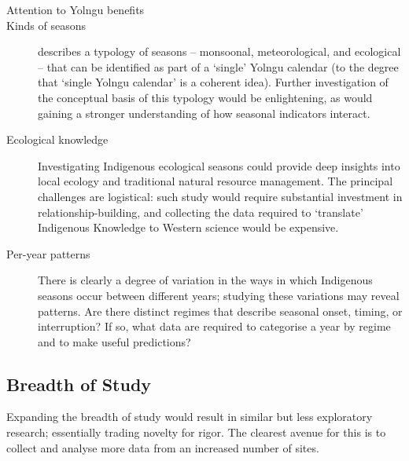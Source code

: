\begin{description}
\item[Attention to Yolngu benefits]

\item[Kinds of seasons]
     describes a typology of seasons -- monsoonal,
    meteorological, and ecological -- that can be identified as part of a
    `single' Yolngu calendar (to the degree that `single Yolngu calendar'
    is a coherent idea).  Further investigation of the conceptual basis of this typology would
    be enlightening, as would gaining a stronger understanding of how
    seasonal indicators interact.

\item[Ecological knowledge]
    Investigating Indigenous ecological seasons could provide deep insights
    into local ecology and traditional natural resource management. The
    principal challenges are logistical:  such study would require substantial
    investment in relationship-building, and collecting the data
    required to `translate' Indigenous Knowledge to Western science would
    be expensive.

\item[Per-year patterns]
    There is clearly a degree of variation in the ways in which Indigenous seasons occur between
    different years; studying these variations may reveal patterns.  Are there distinct
    regimes that describe seasonal onset, timing, or interruption?  If so, what
    data are required to categorise a year by regime and to make useful predictions?
\end{description}

\subsection{Breadth of Study}
Expanding the breadth of study would result in similar but less exploratory
research; essentially trading novelty for rigor.  The clearest avenue for
this is to collect and analyse more data from an increased number of sites.

